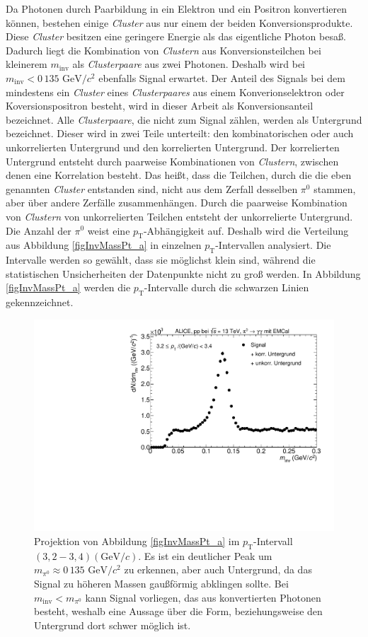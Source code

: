 Da Photonen durch Paarbildung in ein Elektron und ein Positron konvertieren können, bestehen einige \textit{Cluster} aus nur einem der beiden Konversionsprodukte.
Diese \textit{Cluster} besitzen eine geringere Energie als das eigentliche Photon besaß.
Dadurch liegt die Kombination von \textit{Clustern} aus Konversionsteilchen bei kleinerem $m_\text{inv}$ als \textit{Clusterpaare} aus zwei Photonen.
Deshalb wird bei $m_\text{inv}<0\,135\text{ GeV}/c^{2}$ ebenfalls Signal erwartet.
Der Anteil des Signals bei dem mindestens ein \textit{Cluster} eines \textit{Clusterpaares} aus einem Konverionselektron oder Koversionspositron besteht, wird in dieser Arbeit als Konversionsanteil bezeichnet. 
\newline
Alle \textit{Clusterpaare}, die nicht zum Signal zählen, werden als Untergrund bezeichnet.
Dieser wird in zwei Teile unterteilt: den kombinatorischen oder auch unkorrelierten Untergrund und den kor\-re\-lier\-ten Untergrund.
Der korrelierten Untergrund entsteht durch paarweise Kombinationen von \textit{Clustern}, zwischen denen eine Korrelation besteht.
Das heißt, dass die Teilchen, durch die die eben genannten \textit{Cluster} entstanden sind, nicht aus dem Zerfall desselben $\pi^{0}$ stammen, aber über andere Zerfälle zusammenhängen.
Durch die paarweise Kombination von \textit{Clustern} von unkorrelierten Teilchen entsteht der unkorrelierte Untergrund.
\newline
Die Anzahl der $\pi^{0}$ weist eine $p_{\text{T}}$-Abhängigkeit auf.
Deshalb wird die Verteilung aus Abbildung \ref{figInvMassPt_a} in einzelnen $p_{\text{T}}$-Intervallen analysiert.
Die Intervalle werden so gewählt, dass sie möglichst klein sind, während die statistischen Unsicherheiten der Datenpunkte nicht zu groß werden.
In Abbildung \ref{figInvMassPt_a} werden die $p_{\text{T}}$-Intervalle durch die schwarzen Linien gekennzeichnet.
\begin{figure}[tbp]
\centering
\includegraphics[width=.75\linewidth]{hSignalPlusBkg.pdf}
\caption{Projektion von Abbildung \ref{figInvMassPt_a} im $p_{\text{T}}$-Intervall $(3,2 - 3,4) (\text{GeV/}c)$. Es ist ein deutlicher Peak um $m_{\pi^{0}} \approx 0\,135\text{ GeV/}c^{2}$ zu erkennen, aber auch Untergrund, da das Signal zu höheren Massen gaußförmig abklingen sollte. Bei $m_{\text{inv}} < m_{\pi^{0}}$ kann Signal vorliegen, das aus konvertierten Photonen besteht, weshalb eine Aussage über die Form, beziehungsweise den Untergrund dort schwer möglich ist.}
\label{figSignalPlusBkg}
\end{figure}

